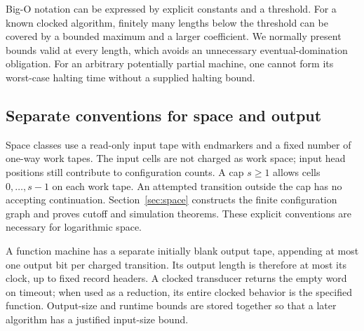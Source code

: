 Big-O notation can be expressed by explicit constants and a threshold.
For a known clocked algorithm, finitely many lengths below the threshold can
be covered by a bounded maximum and a larger coefficient. We normally
present bounds valid at every length, which avoids an unnecessary
eventual-domination obligation. For an arbitrary potentially partial machine,
one cannot form its worst-case halting time without a supplied halting bound.

\subsection{Separate conventions for space and output}

Space classes use a read-only input tape with endmarkers and a fixed number
of one-way work tapes. The input cells are not charged as work space; input
head positions still contribute to configuration counts. A cap \(s\ge1\)
allows cells \(0,\ldots,s-1\) on each work tape. An attempted transition
outside the cap has no accepting continuation. Section~\ref{sec:space}
constructs the finite configuration graph and proves cutoff and simulation
theorems. These explicit conventions are necessary for logarithmic space.

A function machine has a separate initially blank output tape, appending at
most one output bit per charged transition. Its output length is therefore
at most its clock, up to fixed record headers. A clocked transducer returns
the empty word on timeout; when used as a reduction, its entire clocked
behavior is the specified function. Output-size and runtime bounds are
stored together so that a later algorithm has a justified input-size bound.
